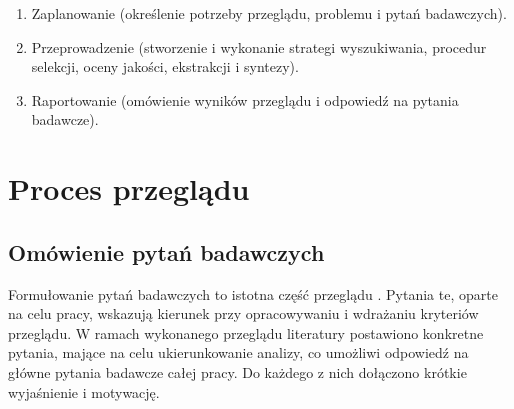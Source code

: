 \begin{enumerate}
    \item Zaplanowanie (określenie potrzeby przeglądu, problemu i pytań badawczych).
    \item Przeprowadzenie (stworzenie i wykonanie strategi wyszukiwania, procedur selekcji, oceny jakości, ekstrakcji i syntezy).
    \item Raportowanie (omówienie wyników przeglądu i odpowiedź na pytania badawcze).
\end{enumerate}

\section{Proces przeglądu}\label{chapter:proces_przegladu}

\subsection{Omówienie pytań badawczych}\label{chapter:omowanie_pytan_badawczych}

Formułowanie pytań badawczych to istotna część przeglądu \cite{KitchenhamProceduresSR}. 
Pytania te, oparte na celu pracy, wskazują kierunek przy opracowywaniu i wdrażaniu kryteriów przeglądu. 
W ramach wykonanego przeglądu literatury postawiono konkretne pytania, mające na celu ukierunkowanie analizy, 
co umożliwi odpowiedź na główne pytania badawcze całej pracy. 
Do każdego z nich dołączono krótkie wyjaśnienie i motywację.
 
